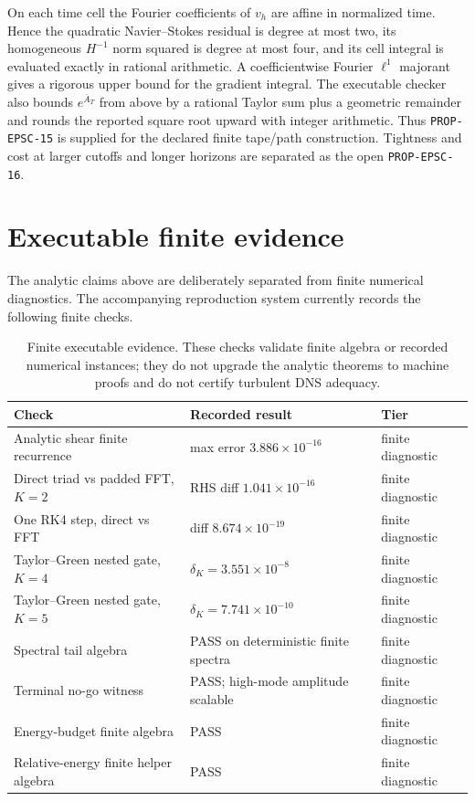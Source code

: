 \documentclass[11pt]{article}
\theoremstyle{definition}
\begin{document}
On each time cell the Fourier coefficients of $v_h$ are affine in normalized time.  Hence the
quadratic Navier--Stokes residual is degree at most two, its homogeneous $H^{-1}$ norm squared is
degree at most four, and its cell integral is evaluated exactly in rational arithmetic.  A
coefficientwise Fourier $\ell^1$ majorant gives a rigorous upper bound for the gradient integral.
The executable checker also bounds $e^{\overline A_T}$ from above by a rational Taylor sum plus a
geometric remainder and rounds the reported square root upward with integer arithmetic.  Thus
\texttt{PROP-EPSC-15} is supplied for the declared finite tape/path construction.  Tightness and
cost at larger cutoffs and longer horizons are separated as the open \texttt{PROP-EPSC-16}.

\section{Executable finite evidence}

The analytic claims above are deliberately separated from finite numerical diagnostics.  The
accompanying reproduction system currently records the following finite checks.

\begin{table}[h]
\centering
\small
\begin{tabular}{lll}
\toprule
Check & Recorded result & Tier \\
\midrule
Analytic shear finite recurrence & max error $3.886\times10^{-16}$ & finite diagnostic \\
Direct triad vs padded FFT, $K=2$ & RHS diff $1.041\times10^{-16}$ & finite diagnostic \\
One RK4 step, direct vs FFT & diff $8.674\times10^{-19}$ & finite diagnostic \\
Taylor--Green nested gate, $K=4$ & $\delta_K=3.551\times10^{-8}$ & finite diagnostic \\
Taylor--Green nested gate, $K=5$ & $\delta_K=7.741\times10^{-10}$ & finite diagnostic \\
Spectral tail algebra & PASS on deterministic finite spectra & finite diagnostic \\
Terminal no-go witness & PASS; high-mode amplitude scalable & finite diagnostic \\
Energy-budget finite algebra & PASS & finite diagnostic \\
Relative-energy finite helper algebra & PASS & finite diagnostic \\
\bottomrule
\end{tabular}
\caption{Finite executable evidence.  These checks validate finite algebra or recorded numerical
instances; they do not upgrade the analytic theorems to machine proofs and do not certify turbulent
DNS adequacy.}
\label{tab:evidence}
\end{table}
\end{document}
